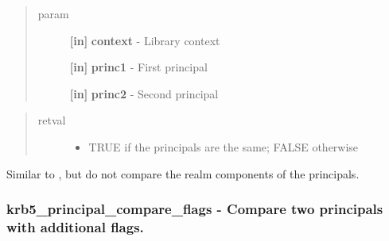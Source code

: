 \documentclass[letterpaper,10pt,english]{sphinxmanual}
\begin{document}
\begin{quote}\begin{description}
\item[{param}] \leavevmode
\textbf{{[}in{]}} \textbf{context} - Library context

\textbf{{[}in{]}} \textbf{princ1} - First principal

\textbf{{[}in{]}} \textbf{princ2} - Second principal

\end{description}\end{quote}
\begin{quote}\begin{description}
\item[{retval}] \leavevmode\begin{itemize}
\item {} 
TRUE   if the principals are the same; FALSE otherwise

\end{itemize}

\end{description}\end{quote}

Similar to {\hyperref[appdev/refs/api/krb5_principal_compare:krb5_principal_compare]{}} , but do not compare the realm components of the principals.


\subsubsection{krb5\_principal\_compare\_flags -  Compare two principals with additional flags.}
\label{appdev/refs/api/krb5_principal_compare_flags:krb5-principal-compare-flags-compare-two-principals-with-additional-flags}\label{appdev/refs/api/krb5_principal_compare_flags::doc}

\begin{fulllineitems}
\label{appdev/refs/api/krb5_principal_compare_flags:krb5_principal_compare_flags}
\end{fulllineitems}
\end{document}
